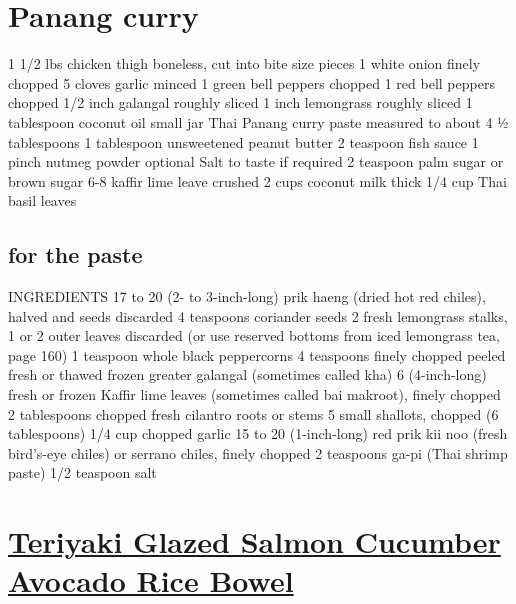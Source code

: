 \documentclass[]{article}
\begin{document}
\hypertarget{panang-curry}{%
\section{Panang curry}\label{panang-curry}}

1 1/2 lbs chicken thigh boneless, cut into bite size pieces
1 white onion finely chopped
5 cloves garlic minced
1 green bell peppers chopped
1 red bell peppers chopped
1/2 inch galangal roughly sliced
1 inch lemongrass roughly sliced
1 tablespoon coconut oil small jar Thai Panang curry paste measured to about 4 ½ tablespoons
1 tablespoon unsweetened peanut butter
2 teaspoon fish sauce
1 pinch nutmeg powder optional
Salt to taste if required
2 teaspoon palm sugar or brown sugar
6-8 kaffir lime leave crushed
2 cups coconut milk thick
1/4 cup Thai basil leaves

\hypertarget{for-the-paste}{%
\subsection{for the paste}\label{for-the-paste}}

INGREDIENTS
17 to 20 (2- to 3-inch-long) prik haeng (dried hot red chiles), halved and seeds discarded
4 teaspoons coriander seeds
2 fresh lemongrass stalks, 1 or 2 outer leaves discarded (or use reserved bottoms from iced lemongrass tea, page 160)
1 teaspoon whole black peppercorns
4 teaspoons finely chopped peeled fresh or thawed frozen greater galangal (sometimes called kha)
6 (4-inch-long) fresh or frozen Kaffir lime leaves (sometimes called bai makroot), finely chopped
2 tablespoons chopped fresh cilantro roots or stems
5 small shallots, chopped (6 tablespoons)
1/4 cup chopped garlic
15 to 20 (1-inch-long) red prik kii noo (fresh bird's-eye chiles) or serrano chiles, finely chopped
2 teaspoons ga-pi (Thai shrimp paste)
1/2 teaspoon salt

\hypertarget{teriyaki-glazed-salmon-cucumber-avocado-rice-bowel}{%
\section{\texorpdfstring{\href{https://www.seriouseats.com/recipes/2016/07/easy-teriyaki-glazed-salmon-cucumber-avocado-rice-bowl-recipe.html}{Teriyaki Glazed Salmon Cucumber Avocado Rice Bowel}}{Teriyaki Glazed Salmon Cucumber Avocado Rice Bowel}}\label{teriyaki-glazed-salmon-cucumber-avocado-rice-bowel}}
\end{document}
